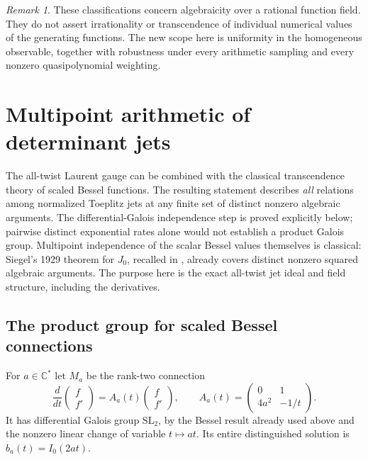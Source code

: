 \documentclass[11pt,a4paper]{article}
\theoremstyle{definition}
\theoremstyle{remark}
\newtheorem{remark}[theorem]{Remark}
\numberwithin{equation}{section}
\begin{document}
\begin{remark}
These classifications concern algebraicity over a rational
function field.  They do not assert irrationality or
transcendence of individual numerical values of the generating
functions.  The new scope here is uniformity in the homogeneous
observable, together with robustness under every arithmetic
sampling and every nonzero quasipolynomial weighting.
\end{remark}


\section{Multipoint arithmetic of determinant jets}
\label{mpj:section}

The all-twist Laurent gauge can be combined with the classical
transcendence theory of scaled Bessel functions. The resulting
statement describes \emph{all} relations among normalized Toeplitz
jets at any finite set of distinct nonzero algebraic arguments.
The differential-Galois independence step is proved explicitly below;
pairwise distinct exponential rates alone would not establish a
product Galois group. Multipoint independence of the scalar Bessel
values themselves is classical: Siegel's 1929 theorem for $J_0$,
recalled in \cite[\S1]{MPJDelaygue2025}, already covers distinct
nonzero squared algebraic arguments. The purpose here is the exact
all-twist jet ideal and field structure, including the derivatives.

\subsection{The product group for scaled Bessel connections}

For $a\in\mathbb C^*$ let $M_a$ be the rank-two connection
\begin{equation}\label{mpj:system}
 \frac d{dt}\begin{pmatrix}f\\f'\end{pmatrix}
 =A_a(t)\begin{pmatrix}f\\f'\end{pmatrix},
 \qquad
 A_a(t)=\begin{pmatrix}0&1\\4a^2&-1/t\end{pmatrix}.
\end{equation}
It has differential Galois group $\mathrm{SL}_2$, by the Bessel
result already used above and the nonzero linear change of variable
$t\mapsto at$. Its entire distinguished solution is
$b_a(t)=I_0(2at)$.
\end{document}

